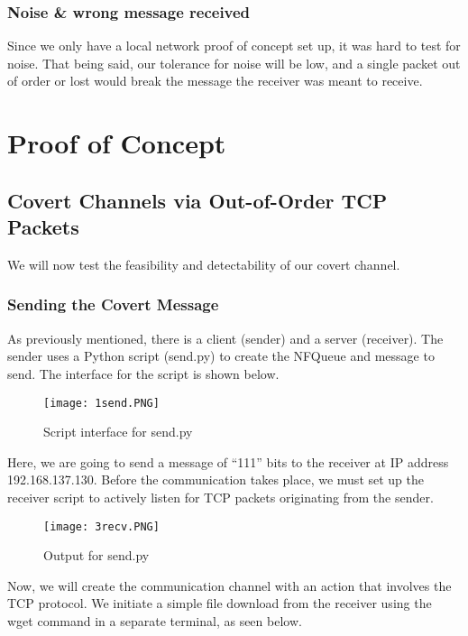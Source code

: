 \documentclass[letterpaper,twocolumn,10pt]{article}
\begin{document}
\subsubsection{Noise \& wrong message received}
Since we only have a local network proof of concept set up, it was hard to test for noise. That being said, our tolerance for noise will be low, and a single packet out of order or lost would break the message the receiver was meant to receive.



\section{Proof of Concept}

\subsection{Covert Channels via Out-of-Order TCP Packets}
We will now test the feasibility and detectability of our covert channel.

\subsubsection{Sending the Covert Message}
As previously mentioned, there is a client (sender) and a server (receiver). The sender uses a Python script (send.py) to create the NFQueue and message to send. The interface for the script is shown below.

\begin{figure}[H]
    \centering
    \texttt{[image: 1send.PNG]}
    \caption{Script interface for send.py}
\end{figure}

Here, we are going to send a message of “111” bits to the receiver at IP address 192.168.137.130. Before the communication takes place, we must set up the receiver script to actively listen for TCP packets originating from the sender.

\begin{figure}[H]
    \centering
    \texttt{[image: 3recv.PNG]}
    \caption{Output for send.py}
\end{figure}

Now, we will create the communication channel with an action that involves the TCP protocol. We initiate a simple file download from the receiver using the wget command in a separate terminal, as seen below.
\end{document}
